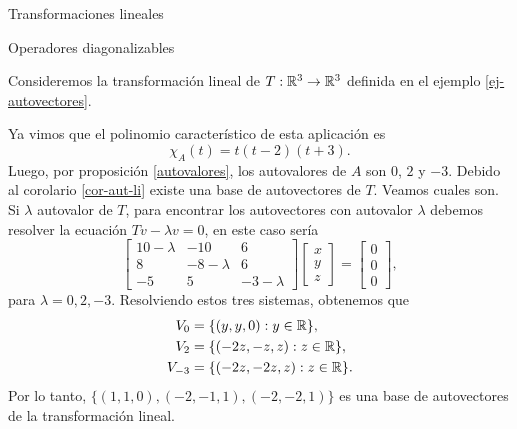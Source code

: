 \begin{chapter}{Transformaciones lineales}
\begin{section}{Operadores diagonalizables}
        \begin{ejemplo*} Consideremos la transformación lineal de $T:\mathbb R^3\to\mathbb R^3$  definida en el ejemplo \ref{ej-autovectores}.

        Ya vimos que  el  polinomio característico de esta aplicación es 
        $$
        \chi_A(t) = t (t-2)(t+3).
        $$
        Luego, por 	proposición \ref{autovalores}, los autovalores de $A$ son $0$, $2$ y $-3$. Debido al corolario \ref{cor-aut-li} existe una base de autovectores de $T$. Veamos cuales son. Si $\lambda$ autovalor de $T$, para encontrar los autovectores con autovalor $\lambda$  debemos resolver la ecuación $Tv -\lambda v=0 $,  en este caso sería
        \begin{equation*}
        \begin{bmatrix}10- \lambda &-10&6\\8& -8- \lambda & 6\\-5& 5& -3- \lambda \end{bmatrix}
        \begin{bmatrix} x\\y\\z \end{bmatrix} =
        \begin{bmatrix} 0\\0 \\0\end{bmatrix},
        \end{equation*}  
        para $\lambda =0, 2,-3$. Resolviendo estos tres sistemas, obtenemos que 
        \begin{align*}
            V_0&= \{(y,y,0): y \in \mathbb R \},\\ 
            V_2 &= \{(-2z,-z,z): z \in \mathbb R \},\\ 
            V_{-3} &= \{(-2z,-2z,z): z \in \mathbb R \}. 
        \end{align*}
        Por lo tanto, $\{(1,1,0), (-2,-1,1), (-2,-2,1)\}$ es una base de autovectores de la transformación lineal. 
        \end{ejemplo*}
        

\end{section}
\end{chapter}
